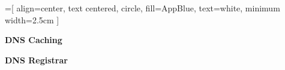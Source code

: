 \begin{frame}[t]\begin{center}\normalsize
	=[
			align=center, 
			text centered,
			circle,
			fill=AppBlue,
			text=white,
			minimum width=2.5cm
		]
\end{center}\end{frame}

\begin{frame}\begin{center}\large
\textbf{DNS Caching}
\end{center}\end{frame}

\begin{frame}\begin{center}\large
\textbf{DNS Registrar}
\end{center}\end{frame}
